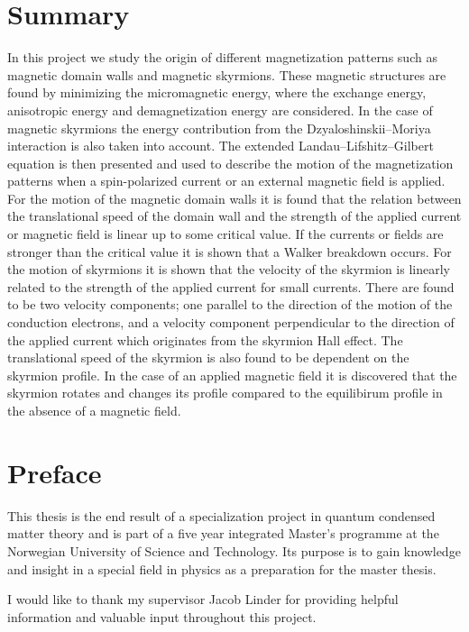 \documentclass[12pt, a4paper, twoside, openright]{article}		%
\let\oldsection\section
\def\section{\cleardoublepage\oldsection}
\numberwithin{equation}{section}
\begin{document}
\section*{Summary}
In this project we study the origin of different magnetization patterns such as magnetic domain walls and magnetic skyrmions. These magnetic structures are found by minimizing the micromagnetic energy, where the exchange energy, anisotropic energy and demagnetization energy are considered. In the case of magnetic skyrmions the energy contribution from the Dzyaloshinskii--Moriya interaction is also taken into account. The extended Landau--Lifshitz--Gilbert equation is then presented and used to describe the motion of the magnetization patterns when a spin-polarized current or an external magnetic field is applied. For the motion of the magnetic domain walls it is found that the relation between the translational speed of the domain wall and the strength of the applied current or magnetic field is linear up to some critical value. If the currents or fields are stronger than the critical value it is shown that a Walker breakdown occurs. For the motion of skyrmions it is shown that the velocity of the skyrmion is linearly related to the strength of the applied current for small currents. There are found to be two velocity components; one parallel to the direction of the motion of the conduction electrons, and a velocity component perpendicular to the direction of the applied current which originates from the skyrmion Hall effect. The translational speed of the skyrmion is also found to be dependent on the skyrmion profile. In the case of an applied magnetic field it is discovered that the skyrmion rotates and changes its profile compared to the equilibirum profile in the absence of a magnetic field.
\newpage

\section*{Preface}
This thesis is the end result of a specialization project in quantum condensed matter theory and is part of a five year integrated Master's programme at the Norwegian University of Science and Technology. Its purpose is to gain knowledge and insight in a special field in physics as a preparation for the master thesis.

I would like to thank my supervisor Jacob Linder for providing helpful information and valuable input throughout this project.\\
\end{document}
